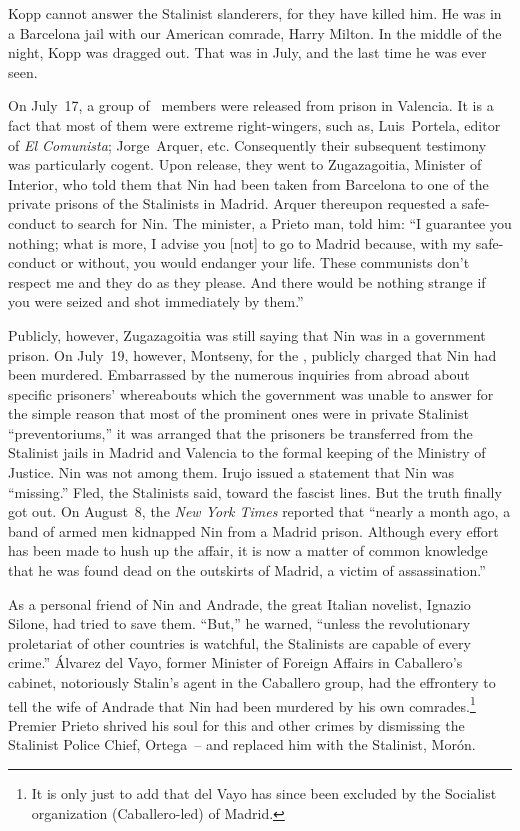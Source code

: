 Kopp cannot answer the Stalinist slanderers, for they have killed him. He was in a Barcelona jail with our American comrade, Harry Milton. In the middle of the night, Kopp was dragged out. That was in July\kn, and the last time he was ever seen.

On July~17\kn, a group of \kern -0.125pt\POUM\ members were released from prison in Valencia. It is a fact that most of them were extreme right-wingers, such as, Luis~Portela, editor of \emph{El Comunista}; Jorge~Arquer\kn, etc. Consequently their subsequent testimony was particularly cogent. Upon release, they went to Zugazagoitia, Minister of Interior\kn, who told them that Nin{\indexANin} had been taken from Barcelona to one of the private prisons of the Stalinists in Madrid. Arquer thereupon requested a safe-conduct to search for Nin. The minister, a Prieto man, told him: ``I guarantee you nothing; what is more, I advise you [not] to go to Madrid because, with my safe-conduct or without, you would endanger your life. These communists don’t respect me and they do as they please. And there would be nothing strange if you were seized and shot immediately by them.\kn\kn''

Publicly, however, Zugazagoitia was still saying that Nin was in a government prison. On July~19, however, Montseny, for the \CNT\kn, publicly charged that Nin had been murdered. Embarrassed by the numerous inquiries from abroad about specific prisoners’ whereabouts which the government was unable to answer for the simple reason that most of the prominent ones were in private Stalinist ``preventoriums,\kn\kn'' it was arranged that the prisoners be transferred from the Stalinist jails in Madrid and Valencia to the formal keeping of the Ministry of Justice. Nin was not among them. Irujo issued a statement that Nin was ``missing.\kn\kn'' Fled, the Stalinists said, toward the fascist lines. But the truth finally got out. On August~8, the \emph{New York Times} reported that ``nearly a month ago, a band of armed men kidnapped Nin from a Madrid prison. Although every effort has been made to hush up the affair\kn, it is now a matter of common knowledge that he was found dead on the outskirts of Madrid, a victim of assassination.\kn\kn''

As a personal friend of Nin and Andrade, the great Italian novelist, Ignazio Silone, had tried to save them. ``But,\kn\kn'' he warned, ``unless the revolutionary proletariat of other countries is watchful, the Stalinists are capable of every crime.\kn\kn'' \'Alvarez del Vayo, former Minister of Foreign Affairs in Caballero’s cabinet, notoriously Stalin’s agent in the Caballero group, had the effrontery to tell the wife of Andrade that Nin had been murdered by his own comrades.\footnote{It is only just to add that del Vayo has since been excluded by the Socialist organization (Caballero-led) of Madrid.} Premier Prieto shrived his soul for this and other crimes by dismissing the Stalinist Police Chief, Ortega~-- and replaced him with the Stalinist, Mor\'on.

